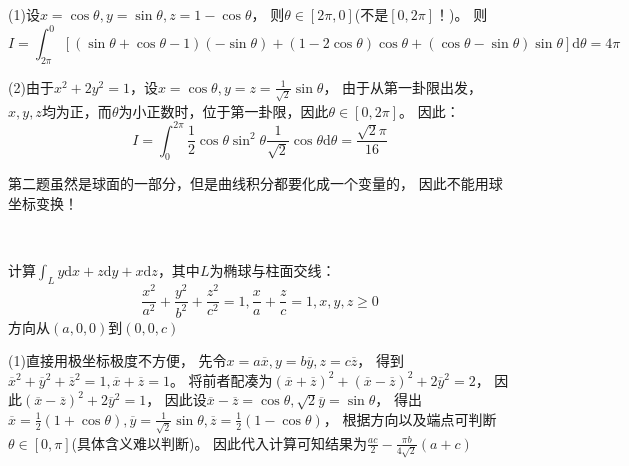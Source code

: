 \begin{solution}
  (1)设$x = \cos \theta, y = \sin \theta, z = 1 - \cos \theta$，
  则$\theta \in [2\pi,0]$(不是$[0,2\pi]$！)。
  则
  \begin{equation*}
    I = \int_{2\pi}^0 [(\sin \theta + \cos \theta - 1)(-\sin \theta) + (1 - 2\cos \theta)\cos \theta + (\cos \theta - \sin \theta)\sin\theta]\mathrm{d} \theta = 4\pi
  \end{equation*}

  (2)由于$x^2 + 2y^2 = 1$，设$x = \cos \theta, y = z = \frac{1}{\sqrt{2}}\sin \theta$，
  由于从第一卦限出发，$x,y,z$均为正，而$\theta$为小正数时，位于第一卦限，因此$\theta \in [0,2\pi]$。
  因此：
  \begin{equation*}
    I = \int_0^{2\pi} \frac{1}{2}\cos \theta \sin ^2 \theta \frac{1}{\sqrt{2}} \cos \theta \mathrm{d} \theta = \frac{\sqrt{2}\pi}{16}
  \end{equation*}
\end{solution}

\begin{note}
  第二题虽然是球面的一部分，但是曲线积分都要化成一个变量的，
  因此不能用球坐标变换！
\end{note}

~

\begin{exercise}[二次曲面交线]
  计算$\int_L y\mathrm{d} x + z\mathrm{d} y + x \mathrm{d} z $，其中$L$为椭球与柱面交线：
  \begin{equation*}
    \frac{x^2}{a^2} + \frac{y^2}{b^2} + \frac{z^2}{c^2} = 1, \frac{x}{a} + \frac{z}{c} = 1, x,y,z \geq 0
  \end{equation*}
  方向从$(a,0,0)$到$(0,0,c)$
\end{exercise}

\begin{solution}
  (1)直接用极坐标极度不方便，
  先令$x = a\overline{x}, y = b\overline{y}, z = c\overline{z}$，
  得到$\overline{x}^2 + \overline{y}^2 + \overline{z}^2 = 1, \overline{x} + \overline{z} = 1$。
  将前者配凑为$(\overline{x} + \overline{z})^2 + (\overline{x} - \overline{z})^2 + 2\overline{y}^2 = 2$，
  因此$(\overline{x} - \overline{z})^2 + 2\overline{y}^2 = 1$，
  因此设$\overline{x} - \overline{z} = \cos \theta, \sqrt{2}\overline{y} = \sin \theta$，
  得出$\overline{x} = \frac{1}{2} (1 + \cos \theta), \overline{y} = \frac{1}{\sqrt{2}}\sin \theta, \overline{z} = \frac{1}{2}(1 - \cos \theta)$，
  根据方向以及端点可判断$\theta \in [0,\pi]$(具体含义难以判断)。
  因此代入计算可知结果为$\frac{ac}{2} - \frac{\pi b}{4 \sqrt{2}} (a + c)$
\end{solution}


